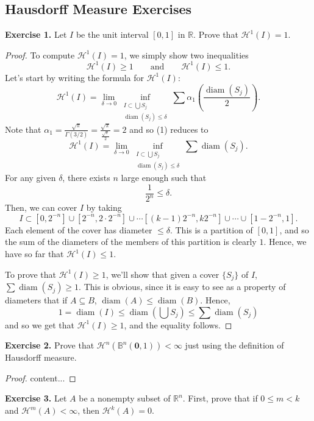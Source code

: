 \documentclass[10pt]{article}
\theoremstyle{plain}
\DeclareMathOperator{\diam}{diam}
\begin{document}
\subsection*{Hausdorff Measure Exercises}
	\noindent \textbf{Exercise 1.} Let $I$ be the unit interval $[0, 1]$ in $\mathbb{R}$. Prove that $\mathcal{H}^1(I) = 1$. 
		\begin{proof}
			To compute $\mathcal{H}^1(I) = 1$, we simply show two inequalities $$\mathcal{H}^1(I) \geq 1 \qquad \text{and} \qquad \mathcal{H}^1(I) \leq 1.$$ Let's start by writing the formula for $\mathcal{H}^1(I)$: \begin{equation} \mathcal{H}^1(I) = \lim_{\delta \to 0} \inf_{\substack{I \subset \bigcup S_j \\ \diam(S_j) \leq \delta}} \sum \alpha_1 \left(\frac{\diam(S_j)}{2}\right). \end{equation} 
		Note that $\alpha_1 = \frac{\sqrt{\pi}}{\Gamma(3/2)} = \frac{\sqrt{\pi}}{\frac{\sqrt{\pi}}{2}} = 2$ and so (1) reduces to $$\mathcal{H}^1(I) = \lim_{\delta \to 0} \inf_{\substack{I \subset \bigcup S_j \\ \diam(S_j) \leq \delta}} \sum \diam(S_j).$$ For any given $\delta$, there exists $n$ large enough such that $$\frac{1}{2^n} \leq \delta.$$ Then, we can cover $I$ by taking $$I \subset [0, 2^{-n}] \cup [2^{-n}, 2 \cdot 2^{-n}] \cup \cdots [(k - 1)2^{-n}, k 2^{-n}] \cup \cdots \cup [1 - 2^{-n}, 1].$$ Each element of the cover has diameter $\leq \delta$. This is a partition of $[0, 1]$, and so the sum of the diameters of the members of this partition is clearly $1$. Hence, we have so far that $\mathcal{H}^1(I) \leq 1$. 
		
		
		
		To prove that $\mathcal{H}^1(I) \geq 1$, we'll show that given a cover $\{S_j\}$ of $I$, $\sum \diam(S_j) \geq 1$. This is obvious, since it is easy to see as a property of diameters that if $A \subseteq B$, $\diam(A) \leq \diam(B)$. Hence, $$1 = \diam(I) \leq \diam\left(\bigcup S_j\right) \leq \sum \diam(S_j)$$ and so we get that $\mathcal{H}^1(I) \geq 1$, and the equality follows. 
		\end{proof}
	
	\noindent \textbf{Exercise 2.} Prove that $\mathcal{H}^n(\mathbb{B}^n(\mathbf{0}, 1)) < \infty$ just using the definition of Hausdorff measure.
		\begin{proof}
			content...
		\end{proof}
	
	\noindent \textbf{Exercise 3.} Let $A$ be a nonempty subset of $\mathbb{R}^n$. First, prove that if $0 \leq m < k$ and $\mathcal{H}^m(A) < \infty$, then $\mathcal{H}^k(A) = 0$. 
	
\end{document}
